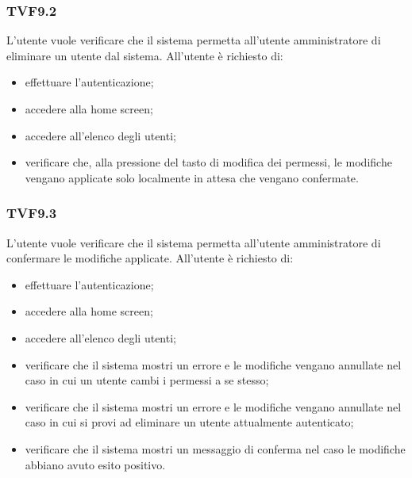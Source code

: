 		\subsubsection{TVF9.2}
			L'utente vuole verificare che il sistema permetta all'utente amministratore di eliminare un utente dal sistema. All'utente è richiesto di:
			\begin{itemize}
				\item effettuare l'autenticazione;
				\item accedere alla home screen;
				\item accedere all'elenco degli utenti;
				\item verificare che, alla pressione del tasto di modifica dei permessi, le modifiche vengano applicate solo localmente in attesa che vengano confermate.
			\end{itemize}
			
		\subsubsection{TVF9.3}
			L'utente vuole verificare che il sistema permetta all'utente amministratore di confermare le modifiche applicate. All'utente è richiesto di:
			\begin{itemize}
				\item effettuare l'autenticazione;
				\item accedere alla home screen;
				\item accedere all'elenco degli utenti;
				\item verificare che il sistema mostri un errore e le modifiche vengano annullate nel caso in cui un utente cambi i permessi a se stesso;
				\item verificare che il sistema mostri un errore e le modifiche vengano annullate nel caso in cui si provi ad eliminare un utente attualmente autenticato;
				\item verificare che il sistema mostri un messaggio di conferma nel caso le modifiche abbiano avuto esito positivo.
			\end{itemize}
			
